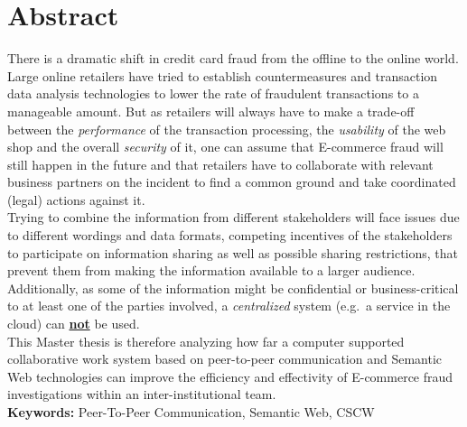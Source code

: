 
\chapter*{Abstract}

There is a dramatic shift in credit card fraud from the offline to the online world. Large online retailers have tried to establish countermeasures and transaction data analysis technologies to lower the rate of fraudulent transactions to a manageable amount. But as retailers will always have to make a trade-off between the \textit{performance} of the transaction processing, the \textit{usability} of the web shop and the overall \textit{security} of it, one can assume that \gls{E-commerce} fraud will still happen in the future and that retailers have to collaborate with relevant business partners on the incident to find a common ground and take coordinated (legal) actions against it. \\

Trying to combine the information from different stakeholders will face issues due to different wordings and data formats, competing incentives of the stakeholders to participate on information sharing as well as possible sharing restrictions, that prevent them from making the information available to a larger audience. Additionally, as some of the information might be confidential or business-critical to at least one of the parties involved, a \textit{centralized} system (e.g.\ a service in the cloud) can \textbf{\underline{not}} be used. \\

This Master thesis is therefore analyzing how far a computer supported collaborative work system based on peer-to-peer communication and Semantic Web technologies can improve the efficiency and effectivity of \gls{E-commerce} fraud investigations within an inter-institutional team. \\[2em]

\textbf{Keywords:} Peer-To-Peer Communication, Semantic Web, CSCW
